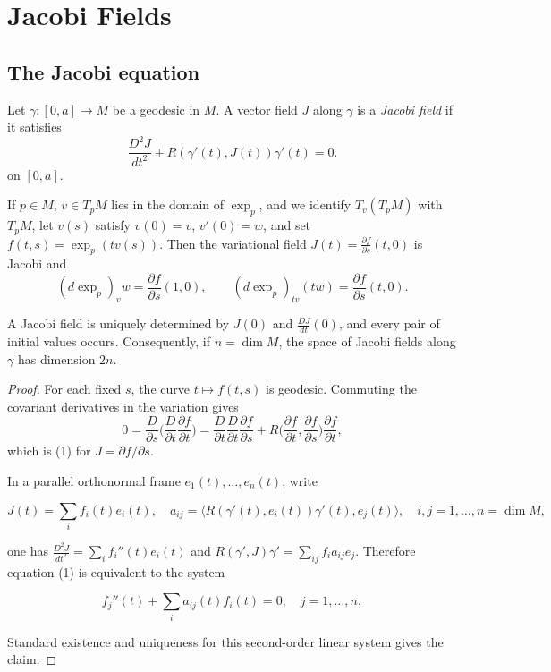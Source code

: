 \chapter{Jacobi Fields}
\label{chap:dc-jacobi-fields}

\section{The Jacobi equation}

\begin{definition}
  \label{def:dc-ch5-2-1}

  Let $\gamma:[0,a]\to M$ be a geodesic in $M$. A vector field $J$ along $\gamma$ is
  a \emph{Jacobi field} if it satisfies
  $$
  \frac{D^2 J}{dt^2}+R(\gamma'(t),J(t))\gamma'(t)=0.\tag{1}
  $$
  on $[0,a]$.

  If $p\in M$, $v\in T_pM$ lies in the domain of $\exp_p$, and we identify
  $T_v(T_pM)$ with $T_pM$, let $v(s)$ satisfy $v(0)=v$, $v'(0)=w$, and set
  $f(t,s)=\exp_p(tv(s))$. Then the variational field
  $J(t)=\frac{\partial f}{\partial s}(t,0)$ is Jacobi and
  $$
  (d\exp_p)_v w=\frac{\partial f}{\partial s}(1,0),\qquad
  (d\exp_p)_{tv}(tw)=\frac{\partial f}{\partial s}(t,0).
  $$

  A Jacobi field is uniquely determined by $J(0)$ and $\frac{DJ}{dt}(0)$, and
  every pair of initial values occurs. Consequently, if $n=\dim M$, the space
  of Jacobi fields along $\gamma$ has dimension $2n$.
\end{definition}
\begin{proof}
  \sketch
  For each fixed $s$, the curve $t\mapsto f(t,s)$ is geodesic. Commuting the
  covariant derivatives in the variation gives
  $$
  0=\frac{D}{\partial s}\Big(\frac{D}{\partial t}\frac{\partial f}{\partial t}\Big)
  =\frac{D}{\partial t}\frac{D}{\partial t}\frac{\partial f}{\partial s}
  +R\Big(\frac{\partial f}{\partial t},\frac{\partial f}{\partial s}\Big)
    \frac{\partial f}{\partial t},
  $$
  which is (1) for $J=\partial f/\partial s$.

  In a parallel orthonormal frame $e_1(t),\dots,e_n(t)$, write

  $$
  J(t)=\sum_i f_i(t)e_i(t),\quad a_{ij}=\langle R(\gamma'(t),e_i(t))\gamma'(t),e_j(t)\rangle,\quad i,j=1,\dots,n=\dim M,
  $$

  one has $\frac{D^2 J}{dt^2}=\sum_i f_i''(t)e_i(t)$ and
  $R(\gamma',J)\gamma'=\sum_{ij}f_i a_{ij}e_j$. Therefore equation (1) is equivalent
  to the system

  $$
  f_j''(t)+\sum_i a_{ij}(t)f_i(t)=0,\quad j=1,\dots,n,
  $$

  Standard existence and uniqueness for this second-order linear system gives
  the claim.
\end{proof}

